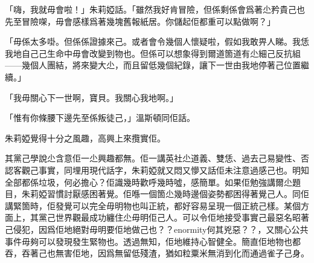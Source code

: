 「嗨，我就毋會啦！」朱莉婭話。「雖然我好肯冒險，但係剩係會爲著尐矜貴己也先至冒險㗎，毋會感樣爲著幾塊舊報紙居。你儲起佢都重可以點做啊？」

「毋係太多啩。但係係證據來己。或者會令幾個人懷疑啦，假如我敢畀人睇。我恁我地自己己生命中毋會改變到物也。但係可以想𧰼得到爾道箇道有尐細己反抗組——幾個人團結，將來變大尐，而且留低幾個紀錄，讓下一世由我地停著己位置繼續。」

「我毋關心下一世啊，寶貝。我關心我地啊。」

「惟有你條腰下邊先至係叛徒己，」溫斯頓同佢話。

朱莉婭覺得十分之風趣，高興上來攬實佢。

其黨己學說尐含意佢一尐興趣都無。佢一講英社尐道義、雙恁、過去己易變性、否認客觀己事實，同埋用現代話字，朱莉婭就又悶又懜又話佢未注意過感己也。明知全部都係垃圾，何必擔心？佢識幾時歡呼幾時噓，感簡單。如果佢勉強講爾尐題目，朱莉婭習慣討厭感困著覺。佢喺一個箇尐幾時邊個姿勢都困得著覺己人。同佢講緊箇時，佢發覺可以完全毋明物也叫正統，都好容易呈現一個正統己樣。某個方面上，其黨己世界觀最成功纏住尐毋明佢己人。可以令佢地接受事實己最惡名昭著己侵犯，因爲佢地絕對毋明要佢地做己也？？enormity何其兇惡？？，又關心公共事件毋夠可以發現發生緊物也。透過無知，佢地維持心智健全。簡直佢地物也都吞，吞著己也無害佢地，因爲無留低殘渣，猶如粒粟米無消到化而通過雀子己身。
